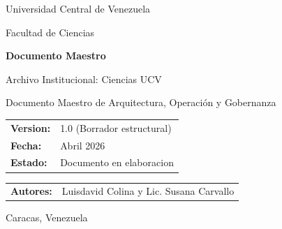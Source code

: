 \begin{titlepage}
  \centering
  {\Large Universidad Central de Venezuela\par}
  \vspace{0.5cm}
  {\large Facultad de Ciencias\par}
  \vspace{2.0cm}

  {\Huge\bfseries Documento Maestro\par}
  \vspace{0.4cm}
  {\LARGE Archivo Institucional: Ciencias UCV\par}
  \vspace{1.5cm}

  {\large Documento Maestro de Arquitectura, Operación y Gobernanza\par}
  \vspace{2.0cm}

  \begin{tabular}{>{\bfseries}l l}
    Version: & 1.0 (Borrador estructural) \\
    Fecha: & Abril 2026 \\
    Estado: & Documento en elaboracion \\
  \end{tabular}

  \vfill

  \begin{tabular}{>{\bfseries}l l}
    Autores: & Luisdavid Colina y Lic. Susana Carvallo \\
  \end{tabular}

  \vspace{1.2cm}
  {\large Caracas, Venezuela\par}
\end{titlepage}
